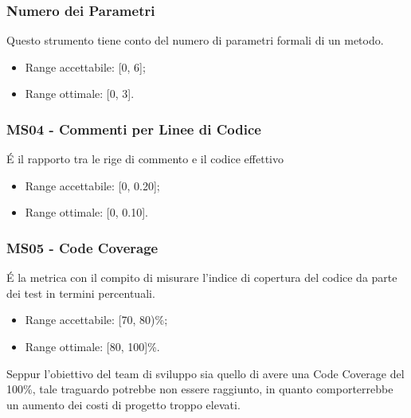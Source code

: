 \subsubsection{Numero dei Parametri}
Questo strumento tiene conto del numero di parametri formali di un metodo.
\begin{itemize}
\item Range accettabile: [0, 6];
\item Range ottimale: [0, 3].
\end{itemize}
\subsubsection{MS04 - Commenti per Linee di Codice}
\'E il rapporto tra le rige di commento e il codice effettivo
\begin{itemize}
\item Range accettabile: [0, 0.20];
\item Range ottimale: [0, 0.10].
\end{itemize}
\subsubsection{MS05 - Code Coverage}
\'E la metrica con il compito di misurare l'indice di copertura del codice da parte dei test in termini percentuali.
\begin{itemize}
\item Range accettabile: [70, 80)\%;
\item Range ottimale: [80, 100]\%.
\end{itemize}
Seppur l'obiettivo del team di sviluppo sia quello di avere una Code Coverage del 100\%, tale traguardo potrebbe non essere raggiunto, in quanto comporterrebbe un aumento dei costi di progetto troppo elevati.